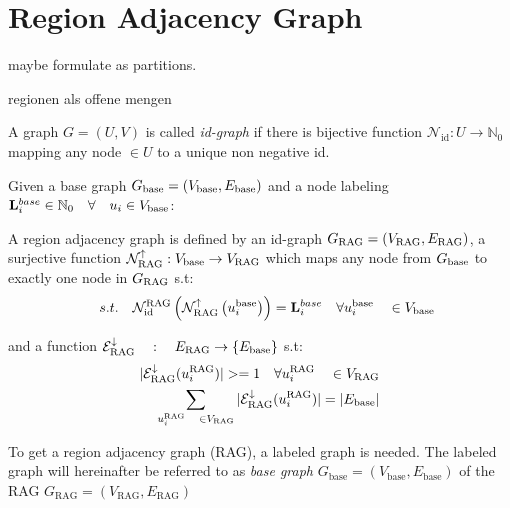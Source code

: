 \chapter{Region Adjacency Graph}\label{ch:regio_adjacency_graph}
 maybe formulate as partitions.

regionen als offene mengen
    
  \begin{MyDef}[Id-Graph]
    A graph $G = (U, V )$ is called \emph{id-graph} if there is
    bijective function  $\mathcal{N}_{\text{id}}: U \rightarrow \mathbb{N}_0 $ 
    mapping any node $\in U$ to a unique non negative id.
  \end{MyDef}
    

  \begin{MyDef}
    Given a base graph $G_{\text{base}} = (V_{\text{base}}, E_{\text{base}})$ and 
    a node labeling $\mathbf{L}_{i}^{base} \in  \mathbb{N}_0 \quad \forall \quad u_i \in V_{\text{base}}$:

    A region adjacency graph  is defined by an id-graph  $G_{\text{RAG}} = (V_{\text{RAG}}, E_{\text{RAG}})$,
    a surjective function $ \mathcal{N}_{\text{RAG}}^{\uparrow} : V_{\text{base}} \rightarrow V_{\text{RAG}}$ which maps
    any node from $G_{\text{base}}$ to exactly one node in $G_{\text{RAG}}$ s.t:
    \[
        \quad s.t. \quad
        \mathcal{N}_{\text{id}}^{\text{RAG}} 
        \left(
            \mathcal{N}_{\text{RAG}}^{\uparrow}
            \left(
                u_i^{\text{base}}
            \right)
        \right) 
        = \mathbf{L}_i^{base}
        \quad \forall u_i^{\text{base}} \quad \in V_{\text{base}}
    \]

    and a function $\mathcal{E}_{\text{RAG}}^{\downarrow} \quad : \quad E_{\text{RAG}} \rightarrow \{  E_{\text{base}} \} $
    s.t:
    \begin{align*}
        |\mathcal{E}_{\text{RAG}}^{\downarrow}(u_i^{\text{RAG}})| >=1 
            \quad \forall u_i^{\text{RAG}} \quad \in V_{\text{RAG}}  \\
        \sum _{u_i^{\text{RAG}} \quad \in V_{\text{RAG}} } 
            |\mathcal{E}_{\text{RAG}}^{\downarrow}(u_i^{\text{RAG}})| = |E_{\text{base}}|
    \end{align*}

  \end{MyDef}



To get a region adjacency graph (RAG), a labeled graph is needed.
The labeled graph will hereinafter be referred to as \emph{base graph} 
$G_{\text{base}}=(V_{\text{base}},E_{\text{base}})$
of the RAG $G_{\text{RAG}}=(V_{\text{RAG}},E_{\text{RAG}})$

